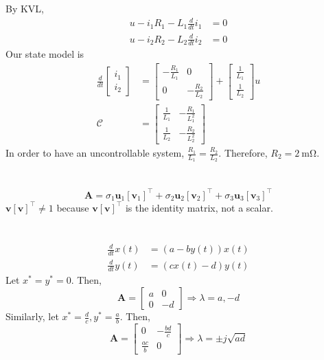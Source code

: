 \documentclass[]{article}
\newcommand{\tpose}[1]{\left[#1\right]^{\! \top} \!\!}
\newcommand{\diff}[1]{\frac{d}{d #1}}
\begin{document}
By KVL,
\begin{align}
	u - i_1 R_1 - L_1 \diff{t} i_1 &= 0 \\
	u - i_2 R_2 - L_2 \diff{t} i_2 &= 0
\end{align}
Our state model is
\begin{align}
	\diff{t} \begin{bmatrix}
	i_1 \\
	i_2
	\end{bmatrix} &=
	\begin{bmatrix}
	-\frac{R_1}{L_1} & 0 \\
	0 & -\frac{R_2}{L_2}
	\end{bmatrix} +
	\begin{bmatrix}
	\frac{1}{L_1} \\
	\frac{1}{L_2}
	\end{bmatrix} u \\
	\bm{\mathcal{C}} &=
	\begin{bmatrix}
	\frac{1}{L_1} & -\frac{R_1}{L_1^2} \\
	\frac{1}{L_2} & -\frac{R_2}{L_2^2}
	\end{bmatrix}
\end{align}
In order to have an uncontrollable system, \(\frac{R_1}{L_1} = \frac{R_2}{L_2}\).
Therefore, \(R_2 = \SI{2}{\milli\ohm}\).

\section{}

\begin{equation}
	\bm{A} =
	\sigma_1 \bm{u}_1 \tpose{\bm{v}_1} + \sigma_2 \bm{u}_2 \tpose{\bm{v}_2} + \sigma_3 \bm{u}_3 \tpose{\bm{v}_3}
\end{equation}
\(\bm{v}\tpose{\bm{v}} \neq 1\) because \(\bm{v}\tpose{\bm{v}}\) is the identity matrix, not a scalar.

\section{}

\begin{align}
	\diff{t} x(t) &= (a - b y(t))x(t) \\
	\diff{t} y(t) &= (c x(t) - d)y(t)
\end{align}
Let \(x^\ast = y^\ast = 0\).
Then,
\begin{equation}
	\bm{A} =
	\begin{bmatrix}
	a & 0 \\
	0 & -d
	\end{bmatrix} \Longrightarrow \lambda = a, -d
\end{equation}
Similarly, let \(x^\ast = \frac{d}{c}, y^\ast = \frac{a}{b}\).
Then,
\begin{equation}
	\bm{A} =
	\begin{bmatrix}
	0 & -\frac{bd}{c} \\
	\frac{ac}{b} & 0
	\end{bmatrix} \Longrightarrow \lambda = \pm j\sqrt{ad}
\end{equation}
\end{document}
